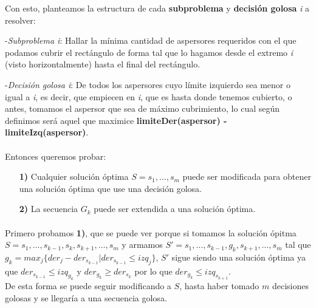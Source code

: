 \documentclass[./main.tex]{subfiles}
\begin{document}
Con esto, planteamos la estructura de cada \textbf{subproblema} y \textbf{decisión golosa} \textit{i} a resolver: \newline

-\textit{Subproblema i}: Hallar la mínima cantidad de aspersores requeridos con el que podamos cubrir el  rectángulo de forma tal que lo hagamos desde el extremo \textit{i} (visto horizontalmente) hasta el final del rectángulo.\newline

-\textit{Decisión golosa i}: De todos los aspersores cuyo límite izquierdo sea menor o igual a \textit{i}, es decir, que empiecen en \textit{i}, que es hasta donde tenemos cubierto, o antes, tomamos el aspersor que sea de máximo cubrimiento, lo cual según definimos será aquel que maximice \textbf{limiteDer(aspersor) - limiteIzq(aspersor)}. \newline

\paragraph{} Entonces queremos probar: \begin{itemize}
  \item[\textbf{1)}] Cualquier solución óptima \(S = s_1, \ldots, s_m\) puede ser modificada para obtener una solución óptima que use una decisión golosa.
  \item[\textbf{2)}] La secuencia \(G_k\) puede ser extendida a una solución óptima.
\end{itemize}

\paragraph{} Primero probamos \textbf{1)}, que se puede ver porque si tomamos la solución ópitma \(S = s_1, \ldots, s_{k-1}, s_k, s_{k+1}, \ldots, s_m\) y armamos \(S' = s_1, \ldots, s_{k-1}, g_k, s_{k+1}, \ldots, s_m\) tal que \(g_k = max_j\{der_j - der_{s_{k-1}} | der_{s_{k-1}} \leq izq_j\}\), \(S'\) sigue siendo una solución óptima ya que \(der_{s_{k-1}} \leq izq_{g_k}\) y \(der_{g_k} \geq der_{s_k}\) por lo que \(der_{g_k} \leq izq_{s_{k+1}}\). \\
De esta forma se puede seguir modificando a \(S\), hasta haber tomado \(m\) decisiones golosas y se llegaría a una secuencia golosa.
\end{document}
